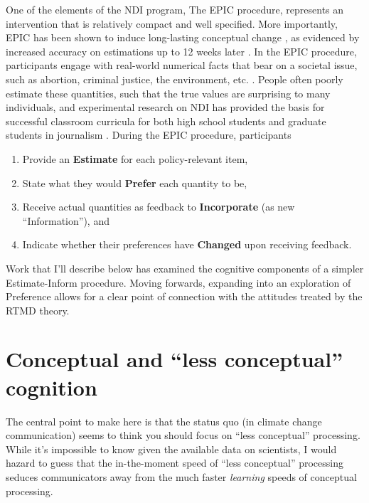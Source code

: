 One of the elements of the NDI program, The EPIC procedure, represents an
intervention that is relatively compact and well specified. More importantly,
EPIC has been shown to induce long-lasting conceptual change
\cite[e.g.,][]{ranney_designing_2008}, as evidenced by increased accuracy on estimations
up to 12 weeks later \cite{munnich_longevities_2005}.  In the EPIC procedure,
participants engage with real-world numerical facts that bear on a societal
issue, such as abortion, criminal justice, the environment, etc.
\cite[e.g.,][]{garcia_de_osuna_qualitative_2004_fixed,munnich_policy_2003_fixed}.  
People often poorly
estimate these quantities, such that the true values are surprising to many
individuals, and experimental research on NDI has provided the basis for
successful classroom curricula for both high school students and graduate
students in journalism
\cite{munnich_numerically-driven_2004,ranney_designing_2008}.  During the EPIC
procedure, participants

\begin{enumerate}
\item Provide an \textbf{Estimate} for each policy-relevant item,
\item State what they would \textbf{Prefer} each quantity to be, 
\item Receive actual quantities as feedback to \textbf{Incorporate} (as new
``Information''), and 
\item Indicate whether their preferences have \textbf{Changed} upon receiving feedback.
\end{enumerate}

Work that I'll describe below has examined the cognitive components of a simpler
Estimate-Inform procedure. Moving forwards, expanding into an exploration of
Preference allows for a clear point of connection with the attitudes treated by
the RTMD theory.

\section{Conceptual and \texorpdfstring{``less conceptual''}{``less conceptual''} cognition}
\label{sec:two}

The central point to make here is that the status quo (in climate change
communication) seems to think you should focus on ``less conceptual''
processing. While it's impossible to know given the available data on
scientists, I would hazard to guess that the in-the-moment speed of ``less
conceptual'' processing seduces communicators away from the much faster
\emph{learning} speeds of conceptual processing.

